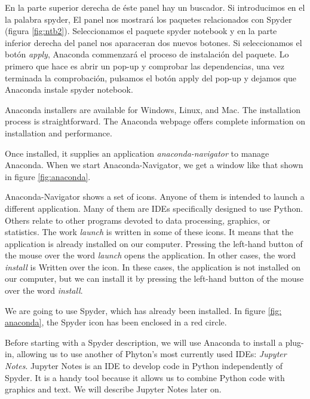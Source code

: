\begin{paracol}{2}
 En la parte superior derecha de éste panel hay un buscador. Si introducimos en el la palabra spyder, El panel nos mostrará los paquetes relacionados con Spyder (figura \ref{fig:ntb2}). Seleccionamos el paquete spyder notebook y en la parte inferior derecha del panel nos aparaceran dos nuevos botones. Si seleccionamos el botón \emph{apply}, Anaconda commenzará el proceso de instalación del paquete. Lo primero que hace es abrir un pop-up y comprobar las dependencias, una vez terminada la comprobación, pulsamos el botón apply del pop-up y dejamos que Anaconda instale spyder notebook.
 

 \switchcolumn
 Anaconda installers are available for Windows, Linux, and Mac. The installation process is straightforward. The Anaconda webpage offers complete information on installation and performance.

 Once installed, it supplies an application \emph{anaconda-navigator} to manage Anaconda. When we start Anaconda-Navigator, we get a window like that shown in figure \ref{fig:anaconda}.

 Anaconda-Navigator shows a set of icons. Anyone of them is intended to launch a different application. Many of them are IDEs specifically designed to use Python. Others relate to other programs devoted to data processing, graphics, or statistics. The work \emph{launch} is written in some of these icons. It means that the application is already installed on our computer. Pressing the left-hand button of the mouse over the word \emph{launch} opens the application. In other cases, the word \emph{install} is Written over the icon. In these cases, the application is not installed on our computer, but we can install it by pressing the left-hand button of the mouse over the word \emph{install}.

 We are going to use Spyder, which has already been installed. In figure \ref{fig: anaconda}, the Spyder icon has been enclosed in a red circle.

 Before starting with a Spyder description, we will use Anaconda to install a plug-in, allowing us to use another of Phyton's most currently used IDEs: \emph{Jupyter Notes}. Jupyter Notes is an IDE to develop code in Python independently of Spyder. It is a handy tool because it allows us to combine Python code with graphics and text. We will describe Jupyter Notes later on.


\end{paracol}
